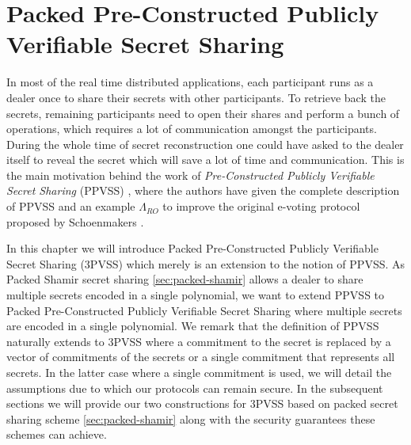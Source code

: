 \chapter{Packed Pre-Constructed Publicly Verifiable Secret Sharing}
\label{cha:3}
In most of the real time distributed applications, each participant runs as a dealer once to share their 
secrets with other participants. To retrieve back the secrets, remaining participants need to open their 
shares and perform a bunch of operations, which requires a lot of communication 
amongst the participants. During the whole time of secret reconstruction one could have asked to the dealer 
itself to reveal the secret which will save a lot of time and communication. This is the main motivation 
behind the work of \textit{Pre-Constructed Publicly Verifiable Secret Sharing} (PPVSS) \cite{cryptoeprint:2025/576}, 
where the authors have given the complete description of PPVSS and an example $\Lambda_{RO}$ to improve 
the original e-voting protocol proposed by Schoenmakers \cite{5581ccd9530540479539d21d1d39ae96}.\par

In this chapter we will introduce Packed Pre-Constructed Publicly Verifiable Secret Sharing (3PVSS) which merely 
is an extension to the notion of PPVSS. As Packed Shamir secret sharing \ref{sec:packed-shamir} allows a 
dealer to share multiple secrets encoded in a single polynomial, we want to extend PPVSS to Packed 
Pre-Constructed Publicly Verifiable Secret Sharing where 
multiple secrets are encoded in a single polynomial. We remark that 
the definition of PPVSS naturally extends to 3PVSS where a commitment to the secret is replaced 
by a vector of commitments of the secrets or a single commitment that represents all secrets. In the latter case 
where a single commitment is used, we will detail the assumptions due to which our protocols 
can remain secure. In the 
subsequent sections we will provide our two constructions for 3PVSS based on packed secret sharing 
scheme \ref{sec:packed-shamir} along with the security guarantees these schemes can achieve.\par



